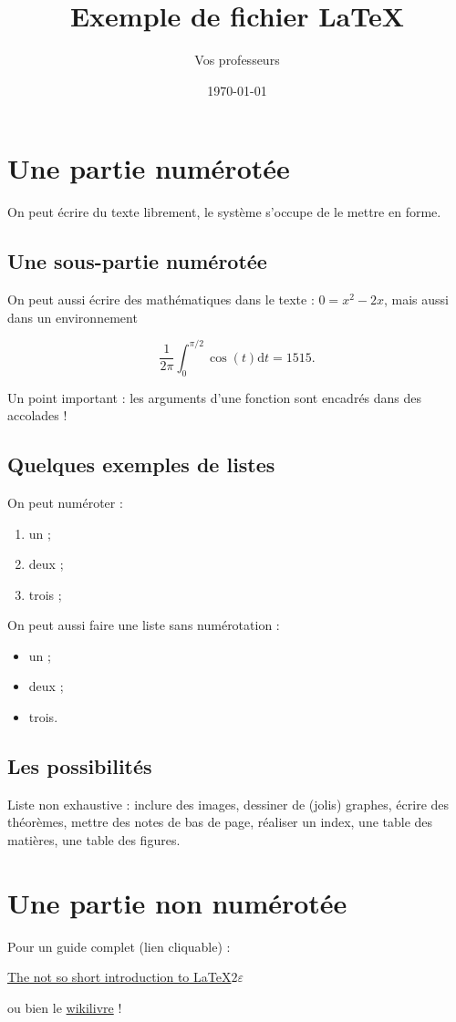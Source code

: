 \documentclass[a4paper,11pt]{scrartcl} %
\author{Vos professeurs}
\date{\today}
\title{Exemple de fichier \LaTeX}
\begin{document}
\maketitle{}

\section{Une partie numérotée}

On peut écrire du texte librement, le système s'occupe de le mettre en forme. 

\subsection{Une sous-partie numérotée}

On peut aussi écrire des mathématiques dans le texte : $0 = x^2 - 2x$, mais aussi dans un environnement

\begin{equation*}
	\frac{1}{2\pi} \int_0^{\pi/2} \cos(t)\mathrm{d}t = 1515. 
\end{equation*}

Un point important : les arguments d'une fonction sont encadrés dans des accolades !

\subsection{Quelques exemples de listes}

On peut numéroter : 
\begin{enumerate}
    \item un ;
    \item deux ;
    \item trois ;
\end{enumerate}
On peut aussi faire une liste sans numérotation :
\begin{itemize}
    \item un ;
    \item deux ;
    \item trois. 
\end{itemize}

\subsection{Les possibilités}

Liste non exhaustive : inclure des images, dessiner de (jolis) graphes, écrire des théorèmes, mettre des notes de bas de page, réaliser un index, une table des matières, une table des figures. 

\section*{Une partie non numérotée}

Pour un guide complet (lien cliquable) : 

\begin{center}
	\href{http://mirrors.ctan.org/info/lshort/english/lshort.pdf}{The not so short introduction to \LaTeX$2\varepsilon$}
\end{center}
ou bien le \href{https://en.wikibooks.org/wiki/LaTeX}{wikilivre} !
\end{document}
